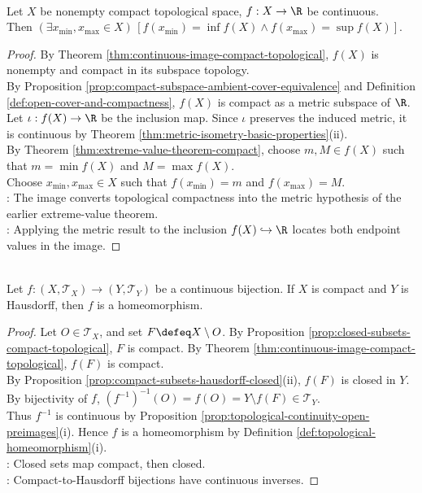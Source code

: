 \begin{corollary} \label{cor:extreme-value-compact-topological} \\
Let $X$ be nonempty compact topological space, $f:X\to\R$ be continuous.\\
Then $(\exists x_{\min\limits},x_{\max\limits}\in X)\,[f(x_{\min\limits})=\inf\limits f(X)\land f(x_{\max\limits})=\sup\limits f(X)]$.
\begin{proof}
By Theorem \ref{thm:continuous-image-compact-topological}, $f(X)$ is nonempty and compact in its subspace topology.\\
By Proposition \ref{prop:compact-subspace-ambient-cover-equivalence} and Definition \ref{def:open-cover-and-compactness}, $f(X)$ is compact as a metric subspace of $\R$.\\
Let $\iota:f(X)\to\R$ be the inclusion map. Since $\iota$ preserves the induced metric, it is continuous by Theorem \ref{thm:metric-isometry-basic-properties}(ii).\\
By Theorem \ref{thm:extreme-value-theorem-compact}, choose $m,M\in f(X)$ such that $m=\min\limits f(X)$ and $M=\max\limits f(X)$.\\
Choose $x_{\min\limits},x_{\max\limits}\in X$ such that $f(x_{\min\limits})=m$ and $f(x_{\max\limits})=M$.\\
: The image converts topological compactness into the metric hypothesis of the earlier extreme-value theorem.\\
: Applying the metric result to the inclusion $f(X)\hookrightarrow\R$ locates both endpoint values in the image.
\end{proof}
\end{corollary}

\begin{theorem} \label{thm:compact-hausdorff-bijection-homeomorphism} \\
Let $f:(X,\mathcal{T}_X)\to(Y,\mathcal{T}_Y)$ be a continuous bijection. If $X$ is compact and $Y$ is Hausdorff, then $f$ is a homeomorphism.
\begin{proof}
Let $O\in\mathcal{T}_X$, and set $F\defeq X\setminus O$. By Proposition \ref{prop:closed-subsets-compact-topological}, $F$ is compact. By Theorem \ref{thm:continuous-image-compact-topological}, $f(F)$ is compact.\\
By Proposition \ref{prop:compact-subsets-hausdorff-closed}(ii), $f(F)$ is closed in $Y$. By bijectivity of $f$, $(f^{-1})^{-1}(O)=f(O)=Y\setminus f(F)\in\mathcal{T}_Y$.\\
Thus $f^{-1}$ is continuous by Proposition \ref{prop:topological-continuity-open-preimages}(i). Hence $f$ is a homeomorphism by Definition \ref{def:topological-homeomorphism}(i).\\
: Closed sets map compact, then closed.\\
: Compact-to-Hausdorff bijections have continuous inverses.
\end{proof}
\end{theorem}

